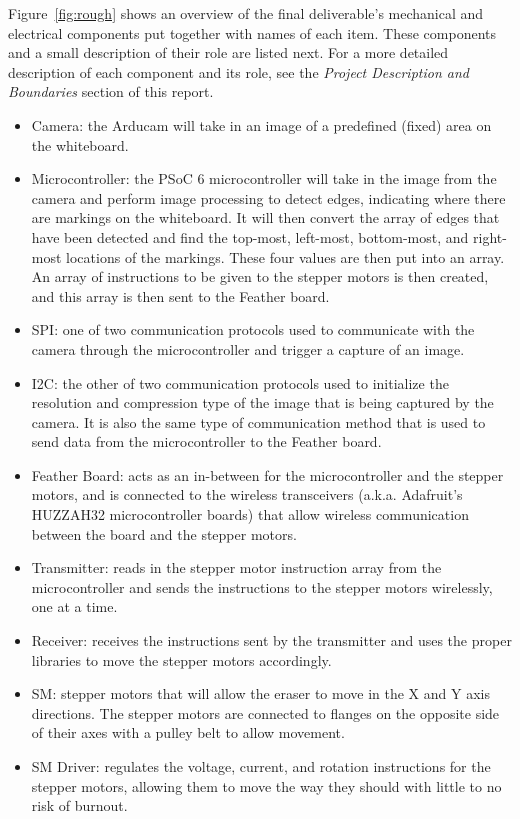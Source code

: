 Figure~\ref{fig:rough} shows an overview of the final deliverable's mechanical and electrical components put together with names of each item. These components and a small description of their role are listed next. For a more detailed description of each component and its role, see the \textit{Project Description and Boundaries} section of this report.

\begin{itemize}
	\item Camera: the Arducam will take in an image of a predefined (fixed) area on the whiteboard.
	\item Microcontroller: the PSoC 6 microcontroller will take in the image from the camera and perform image processing to detect edges, indicating where there are markings on the whiteboard. It will then convert the array of edges that have been detected and find the top-most, left-most, bottom-most, and right-most locations of the markings. These four values are then put into an array. An array of instructions to be given to the stepper motors is then created, and this array is then sent to the Feather board.
	\item SPI: one of two communication protocols used to communicate with the camera through the microcontroller and trigger a capture of an image.
	\item I2C: the other of two communication protocols used to initialize the resolution and compression type of the image that is being captured by the camera. It is also the same type of communication method that is used to send data from the microcontroller to the Feather board.
	\item Feather Board: acts as an in-between for the microcontroller and the stepper motors, and is connected to the wireless transceivers (a.k.a. Adafruit's HUZZAH32 microcontroller boards) that allow wireless communication between the board and the stepper motors.
	\item Transmitter: reads in the stepper motor instruction array from the microcontroller and sends the instructions to the stepper motors wirelessly, one at a time.
	\item Receiver: receives the instructions sent by the transmitter and uses the proper libraries to move the stepper motors accordingly.
	\item SM: stepper motors that will allow the eraser to move in the X and Y axis directions. The stepper motors are connected to flanges on the opposite side of their axes with a pulley belt to allow movement.
	\item SM Driver: regulates the voltage, current, and rotation instructions for the stepper motors, allowing them to move the way they should with little to no risk of burnout.

\end{itemize}
